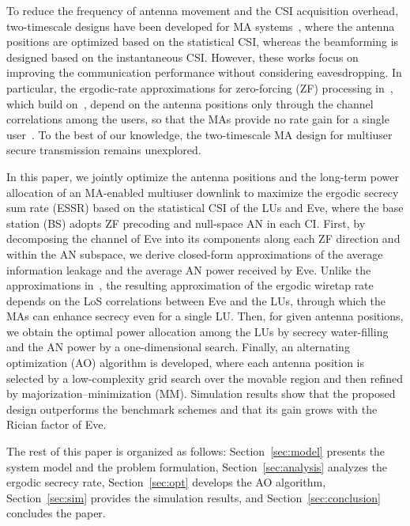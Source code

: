 \documentclass[journal]{IEEEtran}
\newcommand{\rev}[1]{{\color{red}#1}}
\newcommand{\rev}[1]{#1}
\begin{document}
To reduce the frequency of antenna movement and the CSI acquisition overhead, two-timescale designs have been developed for MA systems~\cite{ZhengTCOM2025,HuTVT2025,ZhuArxiv2024NF,YanArxiv2025}, where the antenna positions are optimized based on the statistical CSI, whereas the beamforming is designed based on the instantaneous CSI. However, these works focus on improving the communication performance without considering eavesdropping. In particular, the ergodic-rate approximations for zero-forcing (ZF) processing in~\cite{ZhengTCOM2025,HuTVT2025}, which build on~\cite{ZhangJSTSP2014}, depend on the antenna positions only through the channel correlations among the users, so that the MAs provide no rate gain for a single user~\cite[Remark~2]{ZhengTCOM2025}. To the best of our knowledge, the two-timescale MA design for multiuser secure transmission remains unexplored.

In this paper, we jointly optimize the antenna positions and the long-term power allocation of an MA-enabled multiuser downlink to maximize the ergodic secrecy sum rate (ESSR) based on the statistical CSI of the LUs and Eve, where the base station (BS) adopts ZF precoding and null-space AN in each CI. First, by decomposing the channel of Eve into its components along each ZF direction and within the AN subspace, we derive closed-form approximations of the average information leakage and the average AN power received by Eve. Unlike the approximations in~\cite{ZhengTCOM2025,HuTVT2025}, the resulting approximation of the ergodic wiretap rate depends on the LoS correlations between Eve and the LUs, through which the MAs can enhance secrecy even for a single LU. Then, for given antenna positions, we obtain the optimal power allocation among the LUs by secrecy water-filling~\cite{Gopala2008,Liang2008} and the AN power by a one-dimensional search. Finally, an alternating optimization (AO) algorithm is developed, where each antenna position is selected by a low-complexity grid search over the movable region and then refined by majorization--minimization (MM). Simulation results show that the proposed design outperforms the benchmark schemes and that \rev{its gain grows with the Rician factor of Eve}.

The rest of this paper is organized as follows: Section~\ref{sec:model} presents the system model and the problem formulation, Section~\ref{sec:analysis} analyzes the ergodic secrecy rate, Section~\ref{sec:opt} develops the AO algorithm, Section~\ref{sec:sim} provides the simulation results, and Section~\ref{sec:conclusion} concludes the paper.
\end{document}
